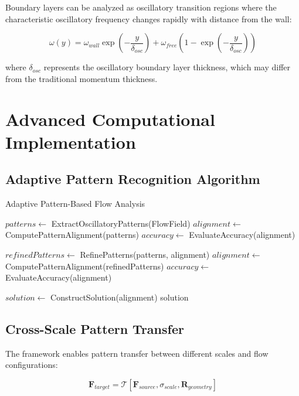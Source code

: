 \documentclass[12pt,a4paper]{article}
\begin{document}
Boundary layers can be analyzed as oscillatory transition regions where the characteristic oscillatory frequency changes rapidly with distance from the wall:

\begin{equation}
\omega(y) = \omega_{wall} \exp\left(-\frac{y}{\delta_{osc}}\right) + \omega_{free} \left(1 - \exp\left(-\frac{y}{\delta_{osc}}\right)\right)
\end{equation}

where $\delta_{osc}$ represents the oscillatory boundary layer thickness, which may differ from the traditional momentum thickness.

\section{Advanced Computational Implementation}

\subsection{Adaptive Pattern Recognition Algorithm}

\begin{algorithm}
\caption{Adaptive Pattern-Based Flow Analysis}
\begin{algorithmic}
    \State $patterns \gets$ ExtractOscillatoryPatterns(FlowField)
    \State $alignment \gets$ ComputePatternAlignment(patterns)
    \State $accuracy \gets$ EvaluateAccuracy(alignment)
    
        \State $refinedPatterns \gets$ RefinePatterns(patterns, alignment)
        \State $alignment \gets$ ComputePatternAlignment(refinedPatterns)
        \State $accuracy \gets$ EvaluateAccuracy(alignment)
    \EndWhile
    
    \State $solution \gets$ ConstructSolution(alignment)
    \State \Return solution
\EndProcedure
\end{algorithmic}
\end{algorithm}

\subsection{Cross-Scale Pattern Transfer}

The framework enables pattern transfer between different scales and flow configurations:

\begin{equation}
\mathbf{F}_{target} = \mathcal{T}[\mathbf{F}_{source}, \sigma_{scale}, \mathbf{R}_{geometry}]
\end{equation}
\end{document}
